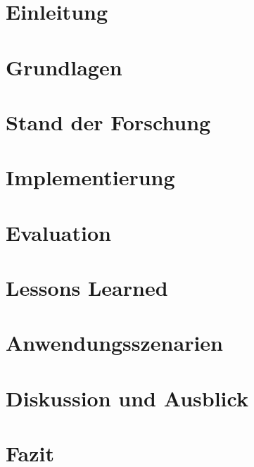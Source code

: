 \mainmatter

\chapter{Einleitung}\label{chap:introduction}


\chapter{Grundlagen}\label{chap:basics}


\chapter{Stand der Forschung}\label{chap:state_of_research}


\chapter{Implementierung}\label{chap:implementation}


\chapter{Evaluation}\label{chap:evaluation}


\chapter{Lessons Learned}\label{chap:lessons_learned}


\chapter{Anwendungsszenarien}\label{chap:application_scenarios}


\chapter{Diskussion und Ausblick}\label{chap:discussion}



\chapter{Fazit}\label{chap:conclusion}

%

